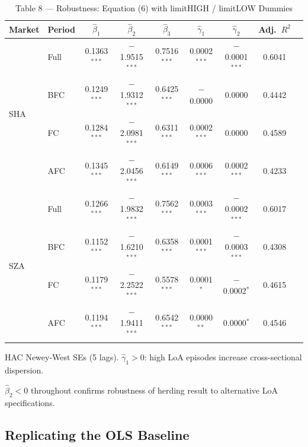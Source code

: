 \documentclass[12pt, a4paper]{article}
\begin{document}
\begin{table}[H]
  \centering
  \caption{Table 8 — Robustness: Equation (6) with limitHIGH / limitLOW Dummies}
  \label{tab:robustness_dummies}
  \begin{threeparttable}
  \small
  \begin{tabular}{llccccccc}
    \toprule
    Market & Period & $\hat\beta_1$ & $\hat\beta_2$ & $\hat\beta_3$ & $\hat\gamma_1$ & $\hat\gamma_2$ & Adj.~$R^2$ \\
    \midrule
    \multirow{4}{*}{SHA}
      & Full & 0.1363$^{***}$ & $-$1.9515$^{***}$ & 0.7516$^{***}$ &  0.0002$^{***}$ & $-$0.0001$^{***}$ & 0.6041 \\
      & BFC  & 0.1249$^{***}$ & $-$1.9312$^{***}$ & 0.6425$^{***}$ & $-$0.0000        &  0.0000           & 0.4442 \\
      & FC   & 0.1284$^{***}$ & $-$2.0981$^{***}$ & 0.6311$^{***}$ &  0.0002$^{***}$ &  0.0000           & 0.4589 \\
      & AFC  & 0.1345$^{***}$ & $-$2.0456$^{***}$ & 0.6149$^{***}$ &  0.0006$^{***}$ &  0.0002$^{***}$   & 0.4233 \\
    \midrule
    \multirow{4}{*}{SZA}
      & Full & 0.1266$^{***}$ & $-$1.9832$^{***}$ & 0.7562$^{***}$ &  0.0003$^{***}$ & $-$0.0002$^{***}$ & 0.6017 \\
      & BFC  & 0.1152$^{***}$ & $-$1.6210$^{***}$ & 0.6358$^{***}$ &  0.0001$^{***}$ & $-$0.0003$^{***}$ & 0.4308 \\
      & FC   & 0.1179$^{***}$ & $-$2.2522$^{***}$ & 0.5578$^{***}$ &  0.0001$^{*}$   & $-$0.0002$^{*}$   & 0.4615 \\
      & AFC  & 0.1194$^{***}$ & $-$1.9411$^{***}$ & 0.6542$^{***}$ &  0.0000$^{**}$  &  0.0000$^{*}$     & 0.4546 \\
    \bottomrule
  \end{tabular}
  \begin{tablenotes}
    \footnotesize
    \item HAC Newey-West SEs (5 lags). $\hat\gamma_1 > 0$: high LoA episodes increase cross-sectional dispersion.
    \item $\hat\beta_2 < 0$ throughout confirms robustness of herding result to alternative LoA specifications.
  \end{tablenotes}
  \end{threeparttable}
\end{table}

\subsection{Replicating the OLS Baseline}
\end{document}
